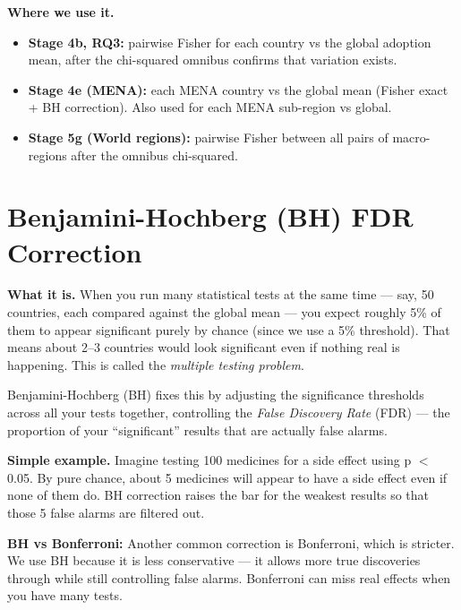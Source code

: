 \documentclass[11pt,a4paper]{article}
\begin{document}
\begin{wherebox}
\textbf{Where we use it.}
\begin{itemize}
  \item \textbf{Stage 4b, RQ3:} pairwise Fisher for each country vs the global adoption mean,
        after the chi-squared omnibus confirms that variation exists.
  \item \textbf{Stage 4e (MENA):} each MENA country vs the global mean (Fisher exact +
        BH correction). Also used for each MENA sub-region vs global.
  \item \textbf{Stage 5g (World regions):} pairwise Fisher between all pairs of macro-regions
        after the omnibus chi-squared.
\end{itemize}
\end{wherebox}

\section{Benjamini-Hochberg (BH) FDR Correction}

\begin{conceptbox}
\textbf{What it is.}
When you run many statistical tests at the same time --- say, 50 countries, each compared
against the global mean --- you expect roughly 5\% of them to appear significant purely by
chance (since we use a 5\% threshold). That means about 2--3 countries would look significant
even if nothing real is happening. This is called the \emph{multiple testing problem}.

\medskip
Benjamini-Hochberg (BH) fixes this by adjusting the significance thresholds across all your
tests together, controlling the \emph{False Discovery Rate} (FDR) --- the proportion of your
``significant'' results that are actually false alarms.

\medskip
\textbf{Simple example.}
Imagine testing 100 medicines for a side effect using p $<$ 0.05. By pure chance, about 5
medicines will appear to have a side effect even if none of them do. BH correction raises the
bar for the weakest results so that those 5 false alarms are filtered out.

\medskip
\textbf{BH vs Bonferroni:} Another common correction is Bonferroni, which is stricter.
We use BH because it is less conservative --- it allows more true discoveries through while
still controlling false alarms. Bonferroni can miss real effects when you have many tests.
\end{conceptbox}
\end{document}
